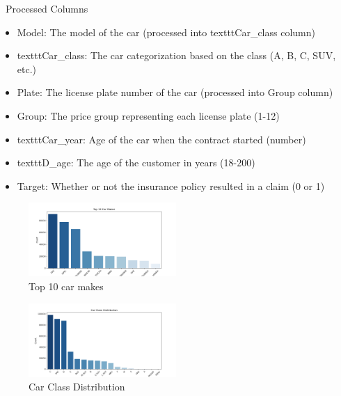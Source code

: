 \documentclass{IEEEtran}
\begin{document}
\
Processed Columns
\begin{itemize}
\item Model: The model of the car (processed into texttt{Car\_class} column)
\item texttt{Car\_class}: The car categorization based on the class (A, B, C, SUV, etc.)
\item Plate: The license plate number of the car (processed into Group column)
\item Group: The price group representing each license plate (1-12)
\item texttt{Car\_year}: Age of the car when the contract started (number)
\item texttt{D\_age}: The age of the customer in years (18-200)
\item Target: Whether or not the insurance policy resulted in a claim (0 or 1)
\end{itemize}

\begin{figure}[h]
\centering
\includegraphics[width=0.5\textwidth]{top_car_makes.png}
\caption{\label{fig:top}Top 10 car makes }
\end{figure}

\begin{figure}[h]
\centering
\includegraphics[width=0.5\textwidth]{car_class_distribution.png}
\caption{\label{fig:ccd}Car Class Distribution  }
\end{figure}
\end{document}
